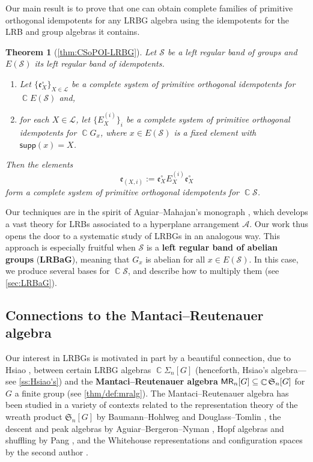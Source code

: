 \documentclass[11pt, oneside, reqno]{amsart}
\newtheorem{theorem}{Theorem}[section]
\theoremstyle{definition}
\numberwithin{equation}{section}
\DeclareMathOperator{\C}{\mathbb{C}}
\newcommand{\defn}[1]{{\color{RoyalBlue}\bf#1}}
\def \A{{\mathcal{A}}}
\def \MR {{\sf{MR}}}
\def \SS{{\mathcal{S}}}
\def \kk{\C}
\def \lat{{\mathcal{L}}}
\def \sym{\mathfrak{S}}
\def \ee{{\mathfrak{e}}}
\def \supp{\mathsf{supp}}
\begin{document}
Our main result is to prove that one can obtain complete families of primitive orthogonal idempotents for any LRBG algebra using the idempotents for the LRB and group algebras it contains. 
    \begin{theorem}[\cref{thm:CSoPOI-LRBG}]\label{thm:mainthmintro}
        Let $\SS$ be a left regular band of groups and $E(\SS)$ its left regular band of idempotents.
        \begin{enumerate}
            \item Let $\{ \ee^\circ_X \}_{X \in \lat}$ be a complete system of primitive orthogonal idempotents for $\C E(\SS)$ and,

            \item
                for each $X \in \lat$, let
                $\{ E_X^{(i)} \}_{i}$ be a complete system of primitive orthogonal idempotents for $\C G_x$, where $x \in E(\SS)$ is a fixed element with $\supp(x) = X$.
        \end{enumerate}
        Then the elements
        \[ \ee_{(X,i)} := \ee^\circ_X E_X^{(i)} \ee^\circ_X \]
        form a complete system of primitive orthogonal idempotents for $\C \SS$.
    \end{theorem}
Our techniques are in the spirit of Aguiar--Mahajan's monograph \cite{am17}, which develops a vast theory for LRBs
associated to a hyperplane arrangement $\A$. Our work thus opens
the door to a systematic study of LRBGs in an analogous way. This approach is especially fruitful when $\SS$ is a \defn{left regular band of abelian groups} (\defn{LRBaG}), meaning that $G_x$ is abelian for all $x \in E(\SS)$. In this case, we produce several bases for $\kk \SS$, and describe how to multiply them (see \cref{sec:LRBaG}). 

\subsection*{Connections to the Mantaci--Reutenauer algebra}

Our interest in LRBGs is motivated in part by a beautiful connection, due to Hsiao \cite{hsiao2007semigroup}, between certain LRBG algebras $\kk \Sigma_n[G]$ (henceforth, Hsiao's algebra---see \cref{ss:Hsiao's}) and the \defn{Mantaci--Reutenauer algebra} $\MR_n[G] \subseteq \kk \sym_n[G]$ for $G$ a finite group (see \cref{thm/def:mralg}). The Mantaci--Reutenauer algebra has been studied in a variety of contexts related to the representation theory of the wreath product $\sym_n[G]$ by Baumann--Hohlweg \cite{BauHoh2008solomon} and Douglass--Tomlin \cite{DouTom2018decomposition}, the descent and peak algebras by Aguiar--Bergeron--Nyman \cite{abn04peak}, Hopf algebras and shuffling by Pang \cite{pang2021eigenvalues}, and the Whitehouse representations and configuration spaces by the second author \cite{brauner2023type}. 
\end{document}
